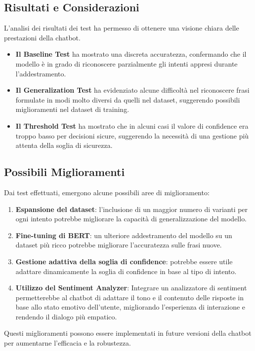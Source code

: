 \documentclass[12pt, letterpaper]{article}
\begin{document}
\subsection{Risultati e Considerazioni}

L’analisi dei risultati dei test ha permesso di ottenere una visione chiara delle prestazioni della chatbot.
\begin{itemize}
	\item \textbf{Il Baseline Test} ha mostrato una discreta accuratezza, confermando che il modello è in grado di riconoscere parzialmente gli intenti appresi durante l’addestramento.
	\item \textbf{Il Generalization Test} ha evidenziato alcune difficoltà nel riconoscere frasi formulate in modi molto diversi da quelli nel dataset, suggerendo possibili miglioramenti nel dataset di training.
	\item \textbf{Il Threshold Test} ha mostrato che in alcuni casi il valore di confidence era troppo basso per decisioni sicure, suggerendo la necessità di una gestione più attenta della soglia di sicurezza.
\end{itemize}

\subsection{Possibili Miglioramenti}

Dai test effettuati, emergono alcune possibili aree di miglioramento:
\begin{enumerate}
	\item \textbf{Espansione del dataset}: l’inclusione di un maggior numero di varianti per ogni intento potrebbe migliorare la capacità di generalizzazione del modello.
	\item \textbf{Fine-tuning di BERT}: un ulteriore addestramento del modello su un dataset più ricco potrebbe migliorare l’accuratezza sulle frasi nuove.
	\item \textbf{Gestione adattiva della soglia di confidence}: potrebbe essere utile adattare dinamicamente la soglia di confidence in base al tipo di intento.
	\item \textbf{Utilizzo del Sentiment Analyzer}: Integrare un analizzatore di sentiment permetterebbe al chatbot di adattare il tono e il contenuto delle risposte in base allo stato emotivo dell’utente, migliorando l’esperienza di interazione e rendendo il dialogo più empatico.
\end{enumerate}
Questi miglioramenti possono essere implementati in future versioni della chatbot per aumentarne l’efficacia e la robustezza.
\end{document}
